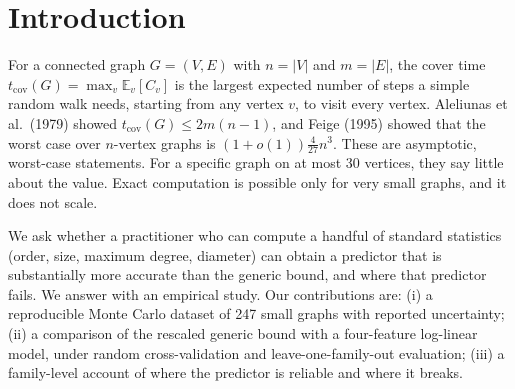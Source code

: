 \documentclass{article}
\begin{document}
\printAffiliationsAndNotice{}

\begin{abstract}
The cover time of a simple random walk is classically bounded by $2m(n-1)$ (Aleliunas et al., 1979), which is loose on small graphs. We ask whether a few cheap graph statistics predict the cover time of graphs with at most 30 vertices more accurately than this bound. We estimate the cover time of 247 connected graphs from 14 synthetic families by Monte Carlo simulation with 5{,}000 walks per start vertex (median relative standard error 0.7\%). The bound always holds but is loose: the median ratio of cover time to $2m(n-1)$ is $0.14$ (range $0.01$--$0.64$), so its error is driven by family-specific constants. A log-linear model in $n$, $m$, the maximum degree $\Delta$ and the diameter $D$ predicts log cover time with median absolute error $0.20$ (about 22\%) in 10-fold cross-validation, versus $0.93$ for the rescaled bound. Its error is concentrated on families it has not seen, notably complete graphs and small-world graphs, where leave-one-family-out errors reach 45--81\%.
\end{abstract}

\section{Introduction}
\label{sec:intro}
For a connected graph $G=(V,E)$ with $n=|V|$ and $m=|E|$, the cover time $t_{\mathrm{cov}}(G)=\max_{v}\mathbb{E}_v[C_v]$ is the largest expected number of steps a simple random walk needs, starting from any vertex $v$, to visit every vertex. Aleliunas et al.\ (1979) showed $t_{\mathrm{cov}}(G)\le 2m(n-1)$, and Feige (1995) showed that the worst case over $n$-vertex graphs is $(1+o(1))\tfrac{4}{27}n^3$. These are asymptotic, worst-case statements. For a specific graph on at most 30 vertices, they say little about the value. Exact computation is possible only for very small graphs, and it does not scale.

We ask whether a practitioner who can compute a handful of standard statistics (order, size, maximum degree, diameter) can obtain a predictor that is substantially more accurate than the generic bound, and where that predictor fails. We answer with an empirical study. Our contributions are: (i) a reproducible Monte Carlo dataset of 247 small graphs with reported uncertainty; (ii) a comparison of the rescaled generic bound with a four-feature log-linear model, under random cross-validation and leave-one-family-out evaluation; (iii) a family-level account of where the predictor is reliable and where it breaks.
\end{document}
